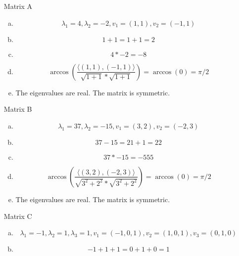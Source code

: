 \documentclass[12pt]{article}
\title{} %
\author{Liheng Cao} %
\date{\today} %
\begin{document}
\maketitle

\section{}
\begin{enumerate}
	\item [Matrix A]
	\begin{enumerate}[(a)]
		\item \[ \lambda_1 = 4, \lambda_2 = -2, v_1 = (1,1), v_2 = (-1,1)\]
		
		\item \[ 1+1 = 1+1 = 2 \]
		
		\item \[ 4*-2 = -8 \]
		
		\item \[ \arccos\left(\dfrac{\langle(1,1),(-1,1)\rangle}{\sqrt{1+1}*\sqrt{1+1}}\right) = \arccos\left(0\right) = \pi/2 \]
		
		\item The eigenvalues are real. The matrix is symmetric.
	\end{enumerate}

	\item [Matrix B]
	\begin{enumerate}[(a)]
		\item \[ \lambda_1 = 37, \lambda_2 = -15, v_1 = (3,2), v_2 = (-2,3)\]
		
		\item \[ 37-15 = 21+1 = 22 \]
		
		\item \[ 37*-15 = -555 \]
		
		\item \[ \arccos\left(\dfrac{\langle(3,2),(-2,3)\rangle}{\sqrt{3^2+2^2}*\sqrt{3^2+2^2}}\right) = \arccos\left(0\right) = \pi/2 \]
		
		\item The eigenvalues are real. The matrix is symmetric.
	\end{enumerate}

	\item [Matrix C]
	\begin{enumerate}[(a)]
		\item \[ \lambda_1 = -1, \lambda_2 = 1, \lambda_3 = 1, v_1 = (-1,0,1), v_2 = (1,0,1), v_3 = (0,1,0)\]
		
		\item \[ -1+1+1 = 0+1+0 = 1 \]
		

\end{enumerate}
\end{enumerate}
\end{document}
